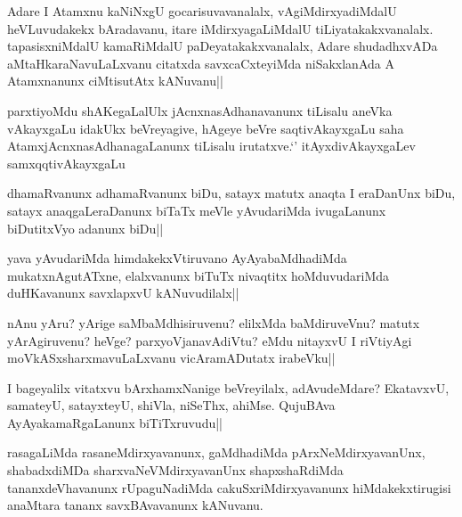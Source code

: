 \begin{artha}
Adare I Atamxnu kaNiNxgU gocarisuvavanalalx, vAgiMdirxyadiMdalU heVLuvudakekx bAradavanu, itare iMdirxyagaLiMdalU tiLiyatakakxvanalalx. tapasisxniMdalU kamaRiMdalU paDeyatakakxvanalalx, Adare shudadhxvADa aMtaHkaraNavuLaLxvanu citatxda savxcaCxteyiMda niSakxlanAda A Atamxnanunx ciMtisutAtx kANuvanu||
\end{artha}

\begin{artha}
parxtiyoMdu shAKegaLalUlx jAcnxnasAdhanavanunx tiLisalu aneVka vAkayxgaLu idakUkx beVreyagive, hAgeye beVre saqtivAkayxgaLu saha AtamxjAcnxnasAdhanagaLanunx tiLisalu irutatxve.`\stext'  itAyxdivAkayxgaLev samxqqtivAkayxgaLu
\end{artha}


\begin{artha}
dhamaRvanunx adhamaRvanunx biDu, satayx matutx anaqta I eraDanUnx biDu, satayx anaqgaLeraDanunx biTaTx meVle yAvudariMda ivugaLanunx biDutitxVyo adanunx biDu||
\end{artha}

\begin{artha}
yava yAvudariMda himdakekxVtiruvano AyAyabaMdhadiMda mukatxnAgutATxne, elalxvanunx biTuTx nivaqtitx hoMduvudariMda duHKavanunx savxlapxvU kANuvudilalx||
\end{artha}

\begin{artha}
nAnu yAru? yArige saMbaMdhisiruvenu? elilxMda baMdiruveVnu? matutx yArAgiruvenu? heVge? parxyoVjanavAdiVtu? eMdu nitayxvU I riVtiyAgi moVkASxsharxmavuLaLxvanu vicAramADutatx irabeVku||
\end{artha}


\begin{artha}
I bageyalilx vitatxvu bArxhamxNanige beVreyilalx, adAvudeMdare? EkatavxvU, samateyU, satayxteyU, shiVla, niSeThx, ahiMse. QujuBAva AyAyakamaRgaLanunx biTiTxruvudu||
\end{artha}

\begin{artha}
rasagaLiMda rasaneMdirxyavanunx, gaMdhadiMda pArxNeMdirxyavanUnx, shabadxdiMDa sharxvaNeVMdirxyavanUnx shapxshaRdiMda tananxdeVhavanunx rUpaguNadiMda cakuSxriMdirxyavanunx hiMdakekxtirugisi anaMtara tananx savxBAvavanunx kANuvanu.
\end{artha}

